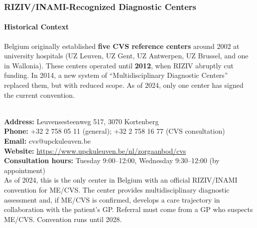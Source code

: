 \subsubsection{RIZIV/INAMI-Recognized Diagnostic Centers}

\paragraph{Historical Context}
Belgium originally established \textbf{five CVS reference centers} around 2002 at university hospitals (UZ Leuven, UZ Gent, UZ Antwerpen, UZ Brussel, and one in Wallonia). These centers operated until \textbf{2012}, when RIZIV abruptly cut funding. In 2014, a new system of ``Multidisciplinary Diagnostic Centers'' replaced them, but with reduced scope. As of 2024, only one center has signed the current convention.

\begin{description}[style=nextline]
\item[UPC KU Leuven -- Multidisciplinair Diagnostisch Centrum ME/CVS] \hfill\\
\textbf{Address:} Leuvensesteenweg 517, 3070 Kortenberg\\
\textbf{Phone:} +32 2 758 05 11 (general); +32 2 758 16 77 (CVS consultation)\\
\textbf{Email:} cvs@upckuleuven.be\\
\textbf{Website:} \url{https://www.upckuleuven.be/nl/zorgaanbod/cvs}\\
\textbf{Consultation hours:} Tuesday 9:00--12:00, Wednesday 9:30--12:00 (by appointment)\\
As of 2024, this is the only center in Belgium with an official RIZIV/INAMI convention for ME/CVS. The center provides multidisciplinary diagnostic assessment and, if ME/CVS is confirmed, develops a care trajectory in collaboration with the patient's GP. Referral must come from a GP who suspects ME/CVS. Convention runs until 2028.
\end{description}


